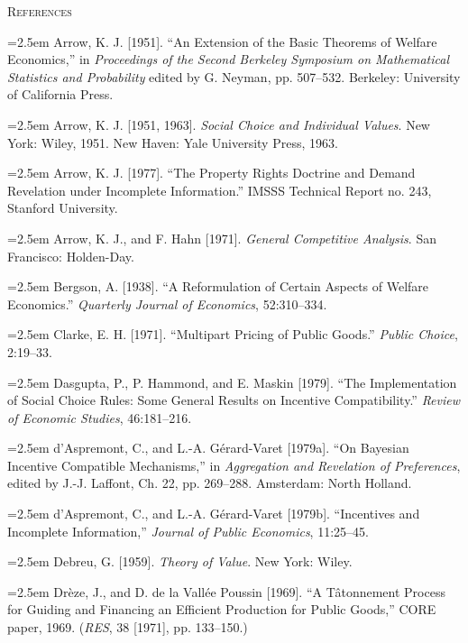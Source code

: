 \documentclass[12pt, letterpaper]{article}
\newcommand{\bibentry}[1]{\noindent\hangindent=2.5em\hangafter=1 \small #1 \par\vspace{0.7em}}
\begin{document}
\vspace{1.5cm}

\begin{center}
    {\large\scshape\color{MidnightBlue} References}
    \vspace{0.8cm}
\end{center}

\bibentry{Arrow, K. J. [1951]. ``An Extension of the Basic Theorems of Welfare Economics,'' in \textit{Proceedings of the Second Berkeley Symposium on Mathematical Statistics and Probability} edited by G. Neyman, pp. 507--532. Berkeley: University of California Press.}

\bibentry{Arrow, K. J. [1951, 1963]. \textit{Social Choice and Individual Values}. New York: Wiley, 1951. New Haven: Yale University Press, 1963.}

\bibentry{Arrow, K. J. [1977]. ``The Property Rights Doctrine and Demand Revelation under Incomplete Information.'' IMSSS Technical Report no. 243, Stanford University.}

\bibentry{Arrow, K. J., and F. Hahn [1971]. \textit{General Competitive Analysis}. San Francisco: Holden-Day.}

\bibentry{Bergson, A. [1938]. ``A Reformulation of Certain Aspects of Welfare Economics.'' \textit{Quarterly Journal of Economics}, 52:310--334.}

\bibentry{Clarke, E. H. [1971]. ``Multipart Pricing of Public Goods.'' \textit{Public Choice}, 2:19--33.}

\bibentry{Dasgupta, P., P. Hammond, and E. Maskin [1979]. ``The Implementation of Social Choice Rules: Some General Results on Incentive Compatibility.'' \textit{Review of Economic Studies}, 46:181--216.}

\bibentry{d'Aspremont, C., and L.-A. Gérard-Varet [1979a]. ``On Bayesian Incentive Compatible Mechanisms,'' in \textit{Aggregation and Revelation of Preferences}, edited by J.-J. Laffont, Ch. 22, pp. 269--288. Amsterdam: North Holland.}

\bibentry{d'Aspremont, C., and L.-A. Gérard-Varet [1979b]. ``Incentives and Incomplete Information,'' \textit{Journal of Public Economics}, 11:25--45.}

\bibentry{Debreu, G. [1959]. \textit{Theory of Value}. New York: Wiley.}

\bibentry{Drèze, J., and D. de la Vallée Poussin [1969]. ``A Tâtonnement Process for Guiding and Financing an Efficient Production for Public Goods,'' CORE paper, 1969. (\textit{RES}, 38 [1971], pp. 133--150.)}
\end{document}
